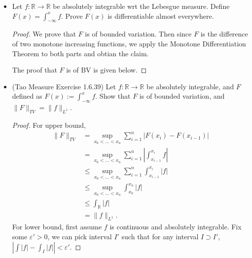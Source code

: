 \begin{itemize}
\begin{proof}
	Fix $\varepsilon>0$, we pick $M$ large enough that $\int _{|f| \ge M} |f| d \mu < \varepsilon$. Now for any $E \in \mathcal{A}$,
	 \[
		\left| \int _E f \right| \le 
		\left| \int _{E \cap \{|f| \ge M\} } f \right| + 
		\left| \int _{E \cap \{|f| \le  M\} }f \right| 
	.\] 
	For the first term, we have
	\[
		\left| \int _{E \cap \{|f| \ge M\} } f \right| \le 
		\left| \int _{\{|f| \ge M\} } f \right|  \le \varepsilon
	.\] 
	For the second term, we have
	\[
		\left| \int _{E \cap \{|f| \le  M\} }f \right|  \le \mu(E) M
	.\] 
	Therefore we have the bound
	\[
		\left|\int _E f\right| \le \varepsilon + \mu(E) M
	.\] 
	By letting $\varepsilon$ small and then picking small enough $E$, we can make the RHS arbitrarily small.
\end{proof}
\item {} Let $f:\mathbb{R} \to \mathbb{R}$ be absolutely integrable wrt the Lebesgue measure. Define $F(x) = \int _{-\infty }^x f$. Prove $F(x)$ is differentiable almost everywhere.
\begin{proof}
	We prove that $F$ is of bounded variation. Then since $F$ is the difference of two monotone increasing functions, we apply the Monotone Differentiation Theorem to both parts and obtian the claim.

	The proof that $F$ is of BV is given below.
\end{proof}
\item (Tao Measure Exercise 1.6.39) Let $f : \mathbb{R} \to  \mathbb{R}$ be absolutely integrable, and $F$ defined as $F(x) := \int _{-\infty }^x f$. Show that $F$ is of bounded variation, and $\|F\|_{TV} = \|f\|_{L^1}$. 
\begin{proof}
	For upper bound,
	\begin{align*}
	\|F\|_{TV} 
	&= \sup _{x_0<\ldots<x_n} \sum_{i=1}^{n} \left| F(x_i) - F(x_{i-1 }) \right|  \\
	&= \sup _{x_0<\ldots<x_n} \sum_{i=1}^{n} \left| \int _{x_{i-1}}^{x_i } f \right|  \\
	&\le  \sup _{x_0<\ldots<x_n} \sum_{i=1}^{n} \int _{x_{i-1}}^{x_i } \left| f \right|  \\
	&\le  \sup _{x_0<\ldots<x_n} \int _{x_0}^{x_n } \left| f \right|  \\
	&\le  \int_{\mathbb{R}} \left| f \right|  \\
	&= \|f\|_{L^1}
	.\end{align*}
For lower bound, first assume $f$ is continuous and absolutely integrable. Fix some $\varepsilon'>0$, we can pick interval $I'$ such that for any interval $I \supset I'$, $\left| \int |f| - \int_I |f| \right| <\varepsilon'$.


\end{proof}
\end{itemize}
